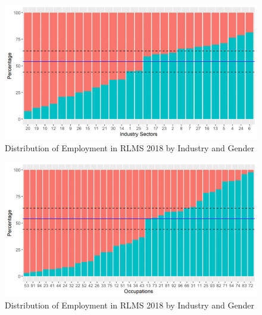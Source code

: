 \documentclass[12pt,a4paper]{article}
\numberwithin{equation}{section}
\begin{document}
\begin{figure}[H]
	\centering
	\includegraphics{gen_ind18.png}
	\caption{Distribution of Employment in RLMS 2018 by Industry and Gender}\label{fig:5}
\end{figure}

\begin{figure}[H]
	\centering
	\includegraphics{gen_occ18.png}
	\caption{Distribution of Employment in RLMS 2018 by Industry and Gender}\label{fig:6}
\end{figure}
	
\end{document}
